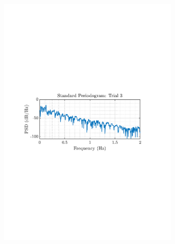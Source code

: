 \documentclass[12pt]{article}
\numberwithin{equation}{section}
\begin{document}
\begin{figure}[H]
\begin{subfigure}{0.49\textwidth}
			\includegraphics[trim={2.2cm 11.2cm 3.15cm  11.2cm}, clip, width=\textwidth]{../MATLAB/figures/q1_5a_fig03.pdf} 
		\end{subfigure}
		\begin{subfigure}{0.49\textwidth}
			\centering

\end{subfigure}
\end{figure}
\end{document}
